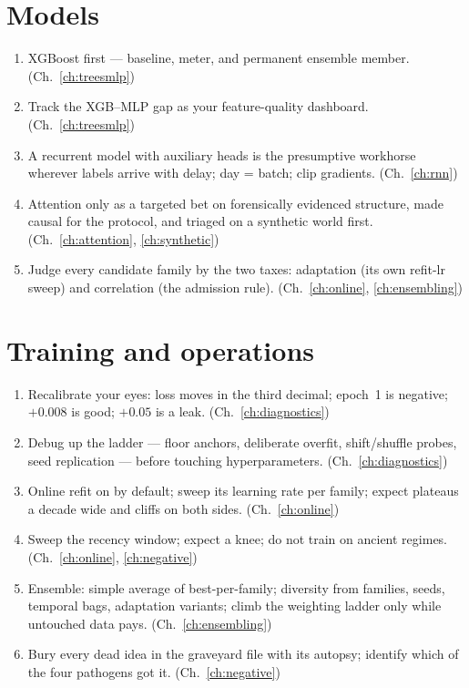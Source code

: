 \section*{Models}
\begin{enumerate}[label=\arabic*., itemsep=1pt, resume]
\item XGBoost first --- baseline, meter, and permanent ensemble member.
  (Ch.~\ref{ch:treesmlp})
\item Track the XGB--MLP gap as your feature-quality dashboard.
  (Ch.~\ref{ch:treesmlp})
\item A recurrent model with auxiliary heads is the presumptive
  workhorse wherever labels arrive with delay; day = batch;
  clip gradients. (Ch.~\ref{ch:rnn})
\item Attention only as a targeted bet on forensically evidenced
  structure, made causal for the protocol, and triaged on a synthetic
  world first. (Ch.~\ref{ch:attention}, \ref{ch:synthetic})
\item Judge every candidate family by the two taxes: adaptation
  (its own refit-lr sweep) and correlation (the admission rule).
  (Ch.~\ref{ch:online}, \ref{ch:ensembling})
\end{enumerate}

\section*{Training and operations}
\begin{enumerate}[label=\arabic*., itemsep=1pt, resume]
\item Recalibrate your eyes: loss moves in the third decimal; epoch~1 is
  negative; $+0.008$ is good; $+0.05$ is a leak.
  (Ch.~\ref{ch:diagnostics})
\item Debug up the ladder --- floor anchors, deliberate overfit,
  shift/shuffle probes, seed replication --- before touching
  hyperparameters. (Ch.~\ref{ch:diagnostics})
\item Online refit on by default; sweep its learning rate per family;
  expect plateaus a decade wide and cliffs on both sides.
  (Ch.~\ref{ch:online})
\item Sweep the recency window; expect a knee; do not train on ancient
  regimes. (Ch.~\ref{ch:online}, \ref{ch:negative})
\item Ensemble: simple average of best-per-family; diversity from
  families, seeds, temporal bags, adaptation variants; climb the
  weighting ladder only while untouched data pays.
  (Ch.~\ref{ch:ensembling})
\item Bury every dead idea in the graveyard file with its autopsy;
  identify which of the four pathogens got it.
  (Ch.~\ref{ch:negative})
\end{enumerate}
